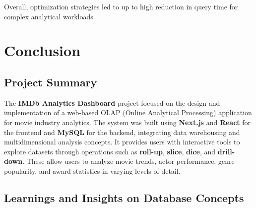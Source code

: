 Overall, optimization strategies led to up to high reduction in query time for complex analytical workloads.

\section{Conclusion}

\subsection{Project Summary}
The \textbf{IMDb Analytics Dashboard} project focused on the design and implementation of a web-based OLAP (Online Analytical Processing) application for movie industry analytics. The system was built using \textbf{Next.js} and \textbf{React} for the frontend and \textbf{MySQL} for the backend, integrating data warehousing and multidimensional analysis concepts. It provides users with interactive tools to explore datasets through operations such as \textbf{roll-up}, \textbf{slice}, \textbf{dice}, and \textbf{drill-down}. These allow users to analyze movie trends, actor performance, genre popularity, and award statistics in varying levels of detail. 

\subsection{Learnings and Insights on Database Concepts}


